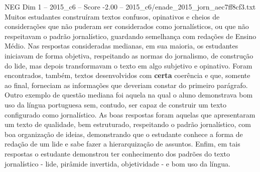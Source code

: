 \begin{textsample}{NEG Dim 1 – 2015\_c6 – Score -2.00 – 2015\_c6/enade\_2015\_jorn\_aec7ff8cf3.txt}
Muitos estudantes construíram textos confusos, opinativos e cheios de considerações que não puderam ser considerados como jornalísticos, ou que não respeitavam o padrão jornalístico, guardando semelhança com redações de Ensino Médio.
Nas respostas consideradas medianas, em sua maioria, os estudantes iniciavam de forma objetiva, respeitando as normas do jornalismo, de construção do lide, mas depois transformavam o texto em algo subjetivo e opinativo.
Foram encontrados, também, textos desenvolvidos com \textbf{certa} coerência e que, somente ao final, forneciam as informações que deveriam constar do primeiro parágrafo.
Outro exemplo de questão mediana foi aquela na qual o aluno demonstrava bom uso da língua portuguesa sem, contudo, ser capaz de construir um texto configurado como jornalístico.
As boas respostas foram aquelas que apresentaram um texto de qualidade, bem estruturado, respeitando o padrão jornalístico, com boa organização de ideias, demonstrando que o estudante conhece a forma de redação de um lide e sabe fazer a hierarquização de assuntos.
Enfim, em tais respostas o estudante demonstrou ter conhecimento dos padrões do texto jornalístico - lide, pirâmide invertida, objetividade - e bom uso da língua.

\end{textsample}
